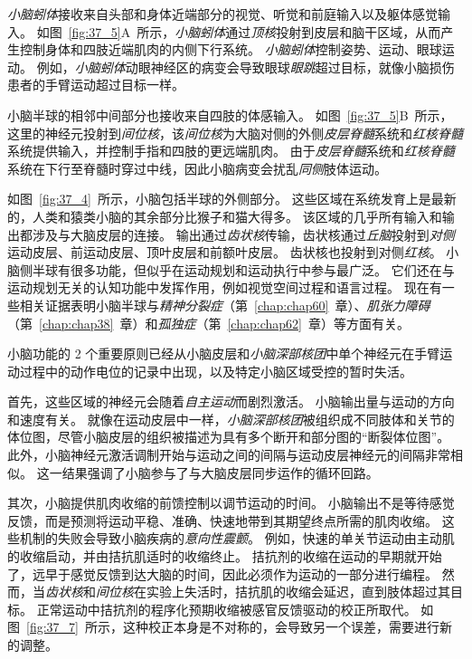 \textit{小脑蚓体}接收来自头部和身体近端部分的视觉、听觉和前庭输入以及躯体感觉输入。
如图~\ref{fig:37_5}A~所示，\textit{小脑蚓体}通过\textit{顶核}投射到皮层和脑干区域，从而产生控制身体和四肢近端肌肉的内侧下行系统。
\textit{小脑蚓体}控制姿势、运动、眼球运动。
例如，\textit{小脑蚓体}动眼神经区的病变会导致眼球\textit{眼跳}超过目标，就像小脑损伤患者的手臂运动超过目标一样。


小脑半球的相邻中间部分也接收来自四肢的体感输入。
如图~\ref{fig:37_5}B~所示，这里的神经元投射到\textit{间位核}，该\textit{间位核}为大脑对侧的外侧\textit{皮层脊髓}系统和\textit{红核脊髓}系统提供输入，并控制手指和四肢的更远端肌肉。
由于\textit{皮层脊髓}系统和\textit{红核脊髓}系统在下行至脊髓时穿过中线，因此小脑病变会扰乱\textit{同侧}肢体运动。


如图~\ref{fig:37_4}~所示，小脑包括半球的外侧部分。
这些区域在系统发育上是最新的，人类和猿类小脑的其余部分比猴子和猫大得多。
该区域的几乎所有输入和输出都涉及与大脑皮层的连接。
输出通过\textit{齿状核}传输，齿状核通过\textit{丘脑}投射到\textit{对侧}运动皮层、前运动皮层、顶叶皮层和前额叶皮层。
齿状核也投射到对侧\textit{红核}。
小脑侧半球有很多功能，但似乎在运动规划和运动执行中参与最广泛。
它们还在与运动规划无关的认知功能中发挥作用，例如视觉空间过程和语言过程。
现在有一些相关证据表明小脑半球与\textit{精神分裂症}（第~\ref{chap:chap60}~章）、\textit{肌张力障碍}（第~\ref{chap:chap38}~章）和\textit{孤独症}（第~\ref{chap:chap62}~章）等方面有关。


小脑功能的 2 个重要原则已经从小脑皮层和\textit{小脑深部核团}中单个神经元在手臂运动过程中的动作电位的记录中出现，以及特定小脑区域受控的暂时失活。


首先，这些区域的神经元会随着\textit{自主运动}而剧烈激活。
小脑输出量与运动的方向和速度有关。
就像在运动皮层中一样，\textit{小脑深部核团}被组织成不同肢体和关节的体位图，尽管小脑皮层的组织被描述为具有多个断开和部分图的“断裂体位图”。
此外，小脑神经元激活调制开始与运动之间的间隔与运动皮层神经元的间隔非常相似。
这一结果强调了小脑参与了与大脑皮层同步运作的循环回路。


其次，小脑提供肌肉收缩的前馈控制以调节运动的时间。
小脑输出不是等待感觉反馈，而是预测将运动平稳、准确、快速地带到其期望终点所需的肌肉收缩。
这些机制的失败会导致小脑疾病的\textit{意向性震颤}。
例如，快速的单关节运动由主动肌的收缩启动，并由拮抗肌适时的收缩终止。
拮抗剂的收缩在运动的早期就开始了，远早于感觉反馈到达大脑的时间，因此必须作为运动的一部分进行编程。
然而，当\textit{齿状核}和\textit{间位核}在实验上失活时，拮抗肌的收缩会延迟，直到肢体超过其目标。
正常运动中拮抗剂的程序化预期收缩被感官反馈驱动的校正所取代。
如图~\ref{fig:37_7}~所示，这种校正本身是不对称的，会导致另一个误差，需要进行新的调整。


